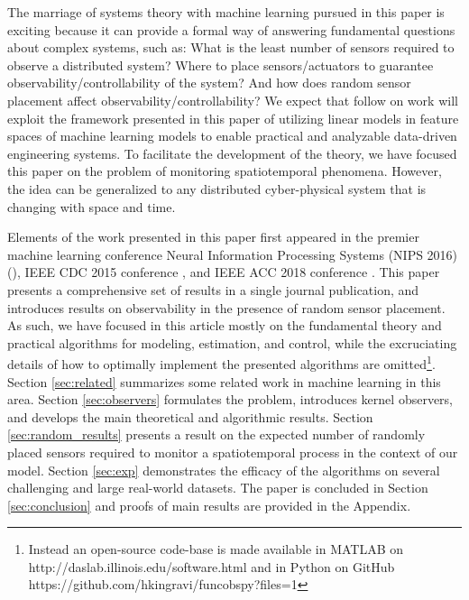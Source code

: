 The marriage of systems theory with machine learning pursued in this paper is exciting because it can provide a formal way of answering fundamental questions about complex systems, such as: %
What is the least number of sensors required to observe a distributed system? Where to place sensors/actuators to guarantee observability/controllability of the system? And how does random sensor placement affect observability/controllability? We expect that follow on work will exploit the framework presented in this paper of utilizing linear models in feature spaces of machine learning models to enable practical and analyzable data-driven engineering systems. To facilitate the development of the theory, we have focused this paper on the problem of monitoring spatiotemporal phenomena. However, the idea can be generalized to any distributed cyber-physical system that is changing with space and time. %

Elements of the work presented in this paper first appeared in the premier machine learning conference Neural Information Processing Systems (NIPS 2016) (\cite{Kingravi16_NIPS}), IEEE CDC 2015 conference \cite{Kingravi:2015a}, and IEEE ACC 2018 conference \cite{Maske18_ACC}.  This paper presents a comprehensive set of results in a single journal publication, and introduces results on observability in the presence of random sensor placement. As such, we have focused in this article mostly on the fundamental theory and practical algorithms for modeling, estimation, and control, while the excruciating details of how to optimally implement the presented algorithms are omitted\footnote{Instead an open-source code-base is made available in MATLAB on http://daslab.illinois.edu/software.html and in Python on GitHub https://github.com/hkingravi/funcobspy?files=1}. Section \ref{sec:related} summarizes some related work in machine learning in this area. Section \ref{sec:observers} formulates the problem,  introduces kernel observers, and develops the main theoretical and algorithmic results.
Section \ref{sec:random_results} presents a result on the expected number of randomly placed sensors required to monitor a spatiotemporal process in the context of our model. Section \ref{sec:exp} demonstrates the efficacy of the algorithms on several challenging and large real-world datasets. The paper is concluded in Section \ref{sec:conclusion} and proofs of main results are provided in the Appendix. 